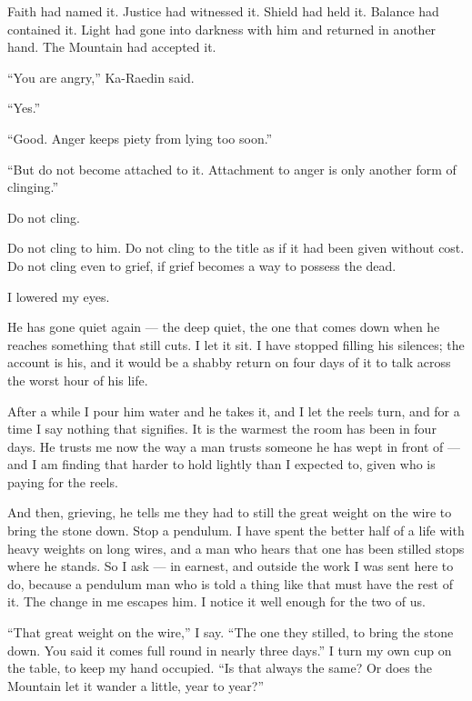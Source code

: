 Faith had named it.
Justice had witnessed it.
Shield had held it.
Balance had contained it.
Light had gone into darkness with him and returned in another hand.
The Mountain had accepted it.\par
``You are angry,'' Ka-Raedin said.\par
``Yes.''\par
``Good.
Anger keeps piety from lying too soon.''\par
``But do not become attached to it.
Attachment to anger is only another form of clinging.''\par
Do not cling.\par
Do not cling to him.
Do not cling to the title as if it had been given without cost.
Do not cling even to grief, if grief becomes a way to possess the dead.\par
I lowered my eyes.\par

\ornament

He has gone quiet again --- the deep quiet, the one that comes down when he reaches something that still cuts. I let it sit. I have stopped filling his silences; the account is his, and it would be a shabby return on four days of it to talk across the worst hour of his life.\par

After a while I pour him water and he takes it, and I let the reels turn, and for a time I say nothing that signifies. It is the warmest the room has been in four days. He trusts me now the way a man trusts someone he has wept in front of --- and I am finding that harder to hold lightly than I expected to, given who is paying for the reels.\par

And then, grieving, he tells me they had to still the great weight on the wire to bring the stone down. Stop a pendulum. I have spent the better half of a life with heavy weights on long wires, and a man who hears that one has been stilled stops where he stands. So I ask --- in earnest, and outside the work I was sent here to do, because a pendulum man who is told a thing like that must have the rest of it. The change in me escapes him. I notice it well enough for the two of us.\par

``That great weight on the wire,'' I say. ``The one they stilled, to bring the stone down. You said it comes full round in nearly three days.'' I turn my own cup on the table, to keep my hand occupied. ``Is that always the same? Or does the Mountain let it wander a little, year to year?''\par

